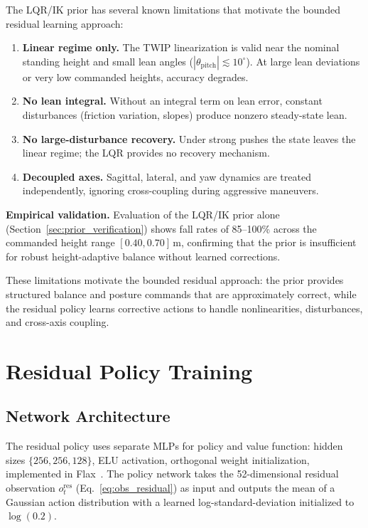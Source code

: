 \documentclass[conference]{IEEEtran}
\begin{document}
The LQR/IK prior has several known limitations that motivate the
bounded residual learning approach:

\begin{enumerate}
    \item \textbf{Linear regime only.}
    The TWIP linearization is valid near the nominal standing height
    and small lean angles ($|\theta_{\mathrm{pitch}}| \lesssim 10^\circ$).
    At large lean deviations or very low commanded heights, accuracy degrades.

    \item \textbf{No lean integral.}
    Without an integral term on lean error, constant disturbances
    (friction variation, slopes) produce nonzero steady-state lean.

    \item \textbf{No large-disturbance recovery.}
    Under strong pushes the state leaves the linear regime;
    the LQR provides no recovery mechanism.

    \item \textbf{Decoupled axes.}
    Sagittal, lateral, and yaw dynamics are treated independently,
    ignoring cross-coupling during aggressive maneuvers.
\end{enumerate}

\noindent\textbf{Empirical validation.}
Evaluation of the LQR/IK prior alone (Section~\ref{sec:prior_verification})
shows fall rates of 85--100\% across the commanded height range
$[0.40, 0.70]\,\mathrm{m}$, confirming that the prior is insufficient
for robust height-adaptive balance without learned corrections.

These limitations motivate the bounded residual approach: the prior
provides structured balance and posture commands that are approximately
correct, while the residual policy learns corrective actions to handle
nonlinearities, disturbances, and cross-axis coupling.

\section{Residual Policy Training}
\label{sec:training}

\subsection{Network Architecture}
The residual policy uses separate MLPs for policy and value function:
hidden sizes $\{256, 256, 128\}$, ELU activation, orthogonal weight
initialization, implemented in Flax~\cite{flax}.
The policy network takes the 52-dimensional residual observation
$o_t^{\mathrm{res}}$ (Eq.~\eqref{eq:obs_residual}) as input and
outputs the mean of a Gaussian action distribution with a learned
log-standard-deviation initialized to $\log(0.2)$.
\end{document}
